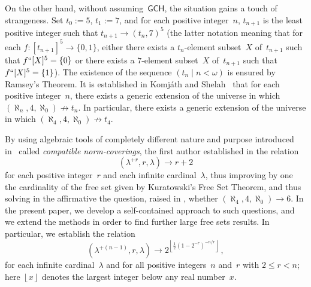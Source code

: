 \documentclass[psamsfonts,reqno]{amsart}
\theoremstyle{plain}
\theoremstyle{definition}
\theoremstyle{remark}
\numberwithin{equation}{section}
\numberwithin{figure}{section}
\newcommand{\gl}{\lambda}
\newcommand{\go}{\omega}
\newcommand{\intgr}[1]{\left\lfloor{#1}\right\rfloor}
\newcommand{\famm}[2]{\left(#1\mid#2\right)}
\newcommand{\set}[1]{\{#1\}}
\begin{document}
On the other hand, without assuming~$\mathsf{GCH}$, the situation gains a touch of strangeness. Set $t_0:=5$, $t_1:=7$, and for each positive integer~$n$, $t_{n+1}$ is the least positive integer such that $t_{n+1}\rightarrow(t_n,7)^5$ (the latter notation meaning that for each $f\colon[t_{n+1}]^5\to\set{0,1}$, either there exists a $t_n$-element subset~$X$ of~$t_{n+1}$ such that $f``[X]^5=\set{0}$ or there exists a $7$-element subset~$X$ of~$t_{n+1}$ such that $f``[X]^5=\set{1}$). The existence of the sequence $\famm{t_n}{n<\go}$ is ensured by Ramsey's Theorem. It is established in Komj\'ath and Shelah~\cite{KoSh00} that for each positive integer~$n$, there exists a generic extension of the universe in which $(\aleph_n,4,\aleph_0)\not\rightarrow t_n$. In particular, there exists a generic extension of the universe in which $(\aleph_4,4,\aleph_0)\not\rightarrow t_4$.

By using algebraic tools of completely different nature and purpose introduced in~\cite{GillTh,Gill1} called \emph{compatible norm-coverings}, the first author established in \cite[Th\'e\-o\-r\`e\-me~3.3.13]{GillTh} the relation
 \begin{equation}\label{Eq:glrr+2}
 (\gl^{+r},r,\gl)\to r+2
 \end{equation}
for each positive integer~$r$ and each infinite cardinal~$\gl$, thus improving by one the cardinality of the free set given by Kuratowski's Free Set Theorem, and thus solving in the affirmative the question, raised in \cite[page~285]{EHMR}, whether $(\aleph_4,4,\aleph_0)\to6$. In the present paper, we develop a self-contained approach to such questions, and we extend the methods in order to find further large free sets results. In particular, we establish the relation
 \begin{equation}\label{Eq:ComplBound}
 (\gl^{+(n-1)},r,\gl)\rightarrow2^{\intgr{\frac{1}{2}(1-2^{-r})^{-n/r}}}\,,
 \end{equation}
for each infinite cardinal~$\gl$ and for all positive integers~$n$ and~$r$ with $2\leq r<n$; here $\intgr x$ denotes the largest integer below any real number~$x$.
\end{document}
